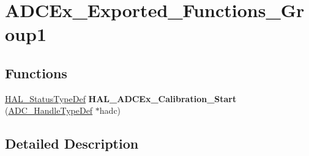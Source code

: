 \hypertarget{group___a_d_c_ex___exported___functions___group1}{}\section{A\+D\+C\+Ex\+\_\+\+Exported\+\_\+\+Functions\+\_\+\+Group1}
\label{group___a_d_c_ex___exported___functions___group1}
\subsection*{Functions}
\begin{DoxyCompactItemize}
\item 
\mbox{\label{group___a_d_c_ex___exported___functions___group1_gabb53dc2716c8250256368c4f60701dab}} 
\hyperlink{stm32f0xx__hal__def_8h_a63c0679d1cb8b8c684fbb0632743478f}{H\+A\+L\+\_\+\+Status\+Type\+Def} {\bfseries H\+A\+L\+\_\+\+A\+D\+C\+Ex\+\_\+\+Calibration\+\_\+\+Start} (\hyperlink{struct_a_d_c___handle_type_def}{A\+D\+C\+\_\+\+Handle\+Type\+Def} $\ast$hadc)
\end{DoxyCompactItemize}


\subsection{Detailed Description}
